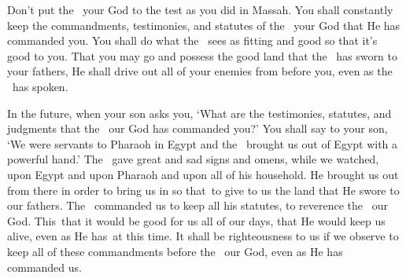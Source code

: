 \begin{inparaenum}
   Don't put the \lord\ your God to the test as you did in Massah.%
   You shall constantly keep the commandments, testimonies, and statutes of the \lord\ your God that He has commanded you.%
   You shall do what the \lord\ sees as fitting and good so that it's good to you. That you may go and possess the good land that the \lord\ has sworn to your fathers,%
   He shall drive out all of your enemies from before you, even as the \lord\ has spoken.%

   In the future, when your son asks you, `What are the testimonies, statutes, and judgments that the \lord\ our God has commanded you?'%
   You shall say to your son, `We were servants to Pharaoh in Egypt and the \lord\ brought us out of Egypt with a powerful hand.'%
   The \lord\ gave great and sad signs and omens, while we watched, upon Egypt and upon Pharaoh and upon all of his household.%
   He brought us out from there in order to bring us in so that\understood{}\ to give to us the land that He swore to our fathers.%
   The \lord\ commanded us to keep all his statutes, to reverence the \lord\ our God. This\understood{}\ that it would be good for us all of our days, that He would keep us alive, even as He has\understood{}\ at this time.%
   It shall be righteousness to us if we observe to keep all of these commandments before the \lord\ our God, even as He has commanded us.%
\end{inparaenum}
